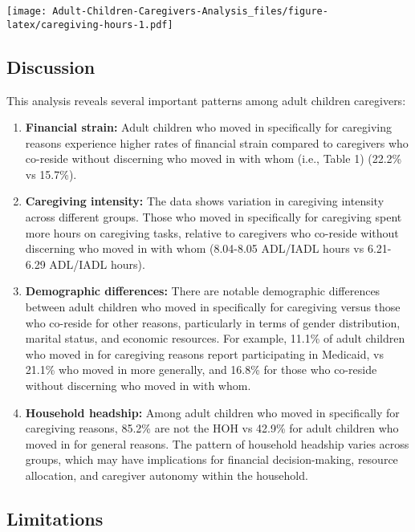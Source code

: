 \documentclass[
]{article}
\begin{document}
\texttt{[image: Adult-Children-Caregivers-Analysis\_files/figure-latex/caregiving-hours-1.pdf]}

\subsection{Discussion}\label{discussion}

This analysis reveals several important patterns among adult children
caregivers:

\begin{enumerate}
\def\labelenumi{\arabic{enumi}.}
\item
  \textbf{Financial strain:} Adult children who moved in specifically
  for caregiving reasons experience higher rates of financial strain
  compared to caregivers who co-reside without discerning who moved in
  with whom (i.e., Table 1) (22.2\% vs 15.7\%).
\item
  \textbf{Caregiving intensity:} The data shows variation in caregiving
  intensity across different groups. Those who moved in specifically for
  caregiving spent more hours on caregiving tasks, relative to
  caregivers who co-reside without discerning who moved in with whom
  (8.04-8.05 ADL/IADL hours vs 6.21-6.29 ADL/IADL hours).
\item
  \textbf{Demographic differences:} There are notable demographic
  differences between adult children who moved in specifically for
  caregiving versus those who co-reside for other reasons, particularly
  in terms of gender distribution, marital status, and economic
  resources. For example, 11.1\% of adult children who moved in for
  caregiving reasons report participating in Medicaid, vs 21.1\% who
  moved in more generally, and 16.8\% for those who co-reside without
  discerning who moved in with whom.
\item
  \textbf{Household headship:} Among adult children who moved in
  specifically for caregiving reasons, 85.2\% are not the HOH vs 42.9\%
  for adult children who moved in for general reasons. The pattern of
  household headship varies across groups, which may have implications
  for financial decision-making, resource allocation, and caregiver
  autonomy within the household.
\end{enumerate}

\subsection{Limitations}\label{limitations}
\end{document}
